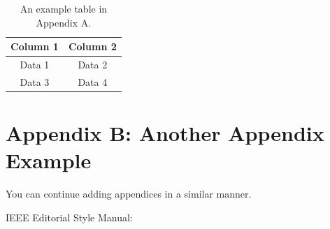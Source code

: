 \documentclass[a4paper,10pt,twocolumn]{article}
\numberwithin{figure}{section}
\numberwithin{table}{section}
\begin{document}
\begin{table}[htbp]
    \centering
    \begin{tabular}{|c|c|}
        \hline
        Column 1 & Column 2 \\
        \hline
        Data 1 & Data 2 \\
        Data 3 & Data 4 \\
        \hline
    \end{tabular}
    \caption{An example table in Appendix A.}
    \label{tab:appendixA}  
\end{table}

\newpage
\section{Appendix B: Another Appendix Example}
\label{appendix:B}
You can continue adding appendices in a similar manner.

IEEE Editorial Style Manual: 
	
\end{document}
